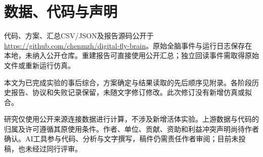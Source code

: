 \section*{数据、代码与声明}
代码、方案、汇总CSV/JSON及报告源码公开于\url{https://github.com/chenmzh/digital-fly-brain}。原始全脑事件与运行日志保存在本地，未纳入公开仓库。重建报告可直接使用公开汇总；独立回读事件需取得原始文件或重新运行仿真。

本文为已完成实验的事后综合，方案确定与结果读取的先后顺序见附录。各阶段历史报告、协议和失败记录保留，未随文字修订修改。此次修订没有新增仿真或拟合。

研究仅使用公开来源连接数据进行计算，不涉及新增活体实验。上游数据与代码的归属及许可遵循其原使用条件。作者、单位、贡献、资助和利益冲突声明尚待作者确认。AI工具参与代码、分析与文字撰写，稿件仍需责任作者审阅；目前未投稿，也未经过同行评审。
\FloatBarrier
